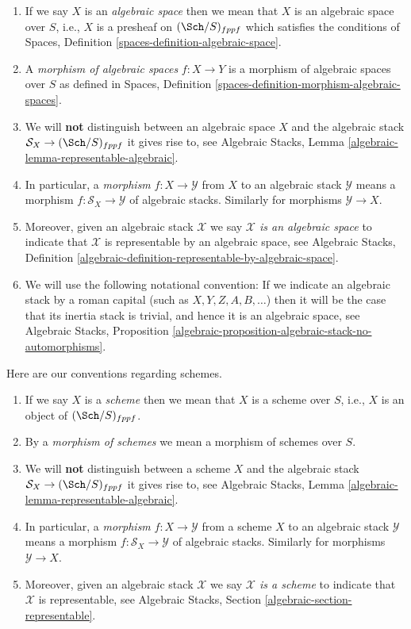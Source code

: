 \begin{enumerate}
\item If we say $X$ is an {\it algebraic space} then we mean that
$X$ is an algebraic space over $S$, i.e., $X$ is a presheaf on
$(\Sch/S)_{fppf}$ which satisfies the conditions of
Spaces, Definition \ref{spaces-definition-algebraic-space}.
\item A {\it morphism of algebraic spaces} $f :X \to Y$ is a morphism
of algebraic spaces over $S$ as defined in
Spaces, Definition \ref{spaces-definition-morphism-algebraic-spaces}.
\item We will {\bf not} distinguish between an algebraic space $X$
and the algebraic stack $\mathcal{S}_X \to (\Sch/S)_{fppf}$
it gives rise to, see
Algebraic Stacks, Lemma \ref{algebraic-lemma-representable-algebraic}.
\item In particular, a {\it morphism} $f : X \to \mathcal{Y}$ from $X$
to an algebraic stack $\mathcal{Y}$ means a morphism
$f : \mathcal{S}_X \to \mathcal{Y}$ of algebraic stacks.
Similarly for morphisms $\mathcal{Y} \to X$.
\item Moreover, given an algebraic stack $\mathcal{X}$ we say
{\it $\mathcal{X}$ is an algebraic space} to indicate that $\mathcal{X}$
is representable by an algebraic space, see
Algebraic Stacks,
Definition \ref{algebraic-definition-representable-by-algebraic-space}.
\item We will use the following notational convention: If we
indicate an algebraic stack by a roman capital
(such as $X, Y, Z, A, B, \ldots$) then it will be the case that
its inertia stack is trivial, and hence it is an algebraic space, see
Algebraic Stacks,
Proposition \ref{algebraic-proposition-algebraic-stack-no-automorphisms}.
\end{enumerate}
Here are our conventions regarding schemes.
\begin{enumerate}
\item If we say $X$ is a {\it scheme} then we mean that
$X$ is a scheme over $S$, i.e., $X$ is an object of $(\Sch/S)_{fppf}$.
\item By a {\it morphism of schemes} we mean a morphism of schemes over $S$.
\item We will {\bf not} distinguish between a scheme $X$ and the
algebraic stack $\mathcal{S}_X \to (\Sch/S)_{fppf}$ it gives rise
to, see
Algebraic Stacks, Lemma \ref{algebraic-lemma-representable-algebraic}.
\item In particular, a {\it morphism} $f : X \to \mathcal{Y}$ from
a scheme $X$ to an algebraic stack $\mathcal{Y}$ means a morphism
$f : \mathcal{S}_X \to \mathcal{Y}$ of algebraic stacks.
Similarly for morphisms $\mathcal{Y} \to X$.
\item Moreover, given an algebraic stack $\mathcal{X}$ we say
{\it $\mathcal{X}$ is a scheme} to indicate that $\mathcal{X}$
is representable, see
Algebraic Stacks, Section \ref{algebraic-section-representable}.
\end{enumerate}

